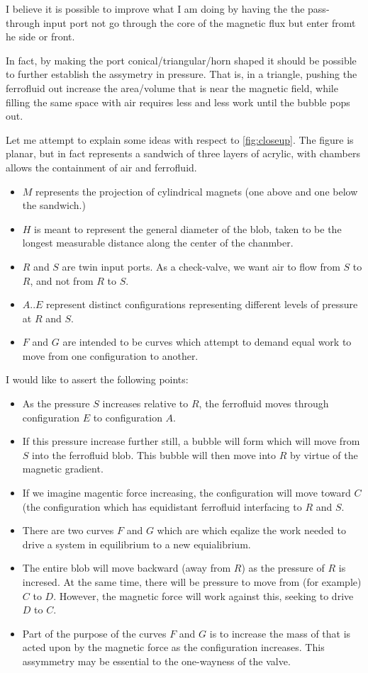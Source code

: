 \documentclass{article}
\begin{document}
I believe it is possible to improve what I am doing by having the the pass-through input port not go through the core of the magnetic
flux but enter fromt he side or front.

In fact, by making the port conical/triangular/horn shaped it should be possible to further establish the assymetry in pressure.
That is, in a triangle, pushing the ferrofluid out increase the area/volume that is near the magnetic field, while filling the
same space with air requires less and less work until the bubble pops out.


Let me attempt to explain some ideas with respect to \ref{fig:closeup}.
The figure is planar, but in fact represents a sandwich of three layers of acrylic, with chambers allows the containment of air
and ferrofluid.
\begin{itemize}
\item $M$ represents the projection of cylindrical magnets (one above and one below the sandwich.)
\item $H$ is meant to represent the general diameter of the blob, taken to be the longest measurable distance along
  the center of the chanmber.
\item $R$ and $S$ are twin input ports. As a check-valve, we want air to flow from $S$ to $R$, and not from $R$ to $S$.
\item $A..E$ represent distinct configurations representing different levels of pressure at $R$ and $S$.
  \item $F$ and $G$ are intended to be curves which attempt to demand equal work to move from one configuration to another.
  \end{itemize}

I would like to assert the following points:
\begin{itemize}
\item As the pressure $S$ increases relative to $R$, the ferrofluid moves through configuration $E$ to configuration $A$.
  \item If this pressure increase further still, a bubble will form which will move from $S$ into the ferrofluid blob.
    This bubble will then move into $R$ by virtue of the magnetic gradient.
  \item If we imagine magentic force increasing, the configuration will move toward $C$ (the configuration which has
    equidistant ferrofluid interfacing to $R$ and $S$.
  \item There are two curves $F$ and $G$ which are which eqalize the work needed to drive a system in equilibrium to
    a new equialibrium.
  \item The entire blob will move backward (away from $R$) as the pressure of $R$ is incresed.  At the same time,
    there will be pressure to move from (for example) $C$ to $D$.  However, the magnetic force will work against
    this, seeking to drive $D$ to $C$.
  \item Part of the purpose of the curves $F$ and $G$ is to increase the mass of that is acted upon by the magnetic
    force as the configuration increases. This assymmetry may be essential to the one-wayness of the valve.
  \end{itemize}
\end{document}
